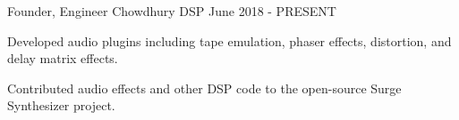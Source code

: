 

\begin{cventries}


    \cventry
    {Founder, Engineer} %
    {Chowdhury DSP} %
    {} %
    {June 2018 - PRESENT} %
    {
      \begin{cvitems} %
        \item {Developed audio plugins including tape emulation, phaser effects,
              distortion, and delay matrix effects.}
              \item {Contributed audio effects and other DSP code to the
              open-source Surge Synthesizer project.}
      \end{cvitems}
    }


\end{cventries}
